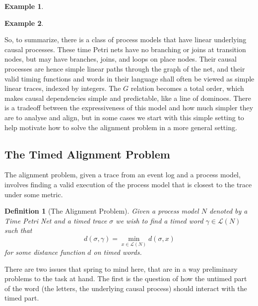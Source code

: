 \documentclass{article}
\newcounter{cases}
\theoremstyle{Definition}
\newtheorem{definition}{Definition}
\theoremstyle{definition}
\newtheorem{example}{Example}
\begin{document}
	\begin{example}\label{Branchingcp}
	\end{example}

	\begin{example}\label{Linearcp}
\end{example}
	
	So, to summarize, there is a class of process models that have linear underlying causal processes. 
	These time Petri nets have no branching or joins at transition nodes, but may have branches, joins, and loops on place nodes. 
	Their causal processes are hence simple linear paths through the graph of the net, and their valid timing functions and words in their language shall often be viewed as simple linear traces, indexed by integers.
	The $G$ relation becomes a total order, which makes causal dependencies simple and predictable, like a line of dominoes. 
	There is a tradeoff between the expressiveness of this model and how much simpler they are to analyse and align, but in some cases we start with this simple setting to help motivate how to solve the alignment problem in a more general setting. 
	
	\subsection{The Timed Alignment Problem}
	The alignment problem, given a trace from an event log and a process model, involves finding a valid execution of the process model that is closest to the trace under some metric.
	
	\begin{definition}[The Alignment Problem]
Given a process model $N$ denoted by a Time Petri Net and a timed trace $\sigma$ we wish to find a timed word $\gamma \in \mathcal{L}(N)$ such that $$d(\sigma, \gamma) = \min_{x \in \mathcal{L}(N)} d(\sigma, x)$$ for some distance function $d$ on timed words. 
	\end{definition}
	
	There are two issues that spring to mind here, that are in a way preliminary problems to the task at hand. 
	The first is the question of how the untimed part of the word (the letters, the underlying causal process) should interact with the timed part. %
	
\end{document}
